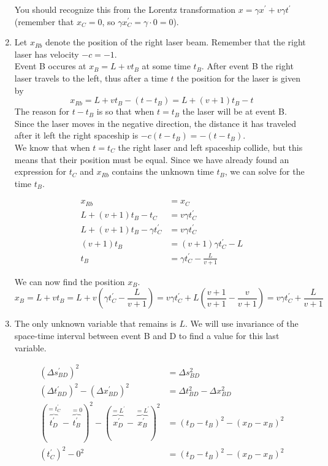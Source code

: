 \documentclass[a4paper,10pt,english]{article}
\begin{document}
\begin{enumerate}
You should recognize this from the Lorentz transformation $x=\gamma x^{\prime}+v\gamma t^{\prime}$ (remember that $x_{C}=0$, so $\gamma x_{C}^{\prime}=\gamma\cdot0=0$).


\item Let $x_{Rb}$ denote the position of the right laser beam. Remember that the right laser has velocity $-c=-1$. 
\\
Event B occures at $x_{B}=L+vt_{B}$ at some time $t_{B}$. After event B the right laser travels to the left, thus after a time $t$ the position for the laser is given by 
\begin{equation}\label{eq:right_laser}x_{Rb}=L+vt_{B}-(t-t_{B})=L+(v+1)t_{B}-t\end{equation}
The reason for $t-t_{B}$ is so that when $t=t_{B}$ the laser will be at event B. Since the laser moves in the negative direction, the distance it has traveled after it left the right spaceship is $-c(t-t_{B})=-(t-t_{B})$.
\\
We know that when $t=t_{C}$ the right laser and left spaceship collide, but this means that their position must be equal. Since we have already found an expression for $t_{C}$ and $x_{Rb}$ contains the unknown time $t_{B}$, we can solve for the time $t_{B}$.

\begin{align*}
x_{Rb}&=x_{C}\\
L+(v+1)t_{B}-t_{C}&=v\gamma t_{C}^{\prime}\\
L+(v+1)t_{B}-\gamma t_{C}^{\prime}&=v\gamma t_{C}^{\prime}\\
(v+1)t_{B}&=(v+1)\gamma t_{C}^{\prime}-L\\
t_{B}&=\gamma t_{C}^{\prime}-\frac{L}{v+1}
\end{align*}

We can now find the position $x_{B}$.
\begin{equation*}
x_{B}=L+vt_{B}=L+v\left(\gamma t_{C}^{\prime}-\frac{L}{v+1}\right)=v\gamma t_{C}^{\prime}+L\left(\frac{v+1}{v+1}-\frac{v}{v+1}\right)=v\gamma t_{C}^{\prime}+\frac{L}{v+1}
\end{equation*}

\item The only unknown variable that remains is $L$. We will use invariance of the space-time interval between event B and D to find a value for this last variable.

\begin{align}\label{eq:unfiniched_interval}
\left(\Delta s_{BD}^{\prime}\right)^{2}&=\Delta s_{BD}^{2} \nonumber\\
\left(\Delta t_{BD}^{\prime}\right)^{2}-\left(\Delta x_{BD}^{\prime}\right)^{2}&=\Delta t_{BD}^{2}-\Delta x_{BD}^{2} \nonumber\\
\left(\overbrace{t_{D}^{\prime}}^{=t_{C}^{\prime}}-\overbrace{t_{B}^{\prime}}^{=0}\right)^{2}-\left(\overbrace{x_{D}^{\prime}}^{=L^{\prime}}-\overbrace{x_{B}^{\prime}}^{=L^{\prime}}\right)^{2}&=\left(t_{D}-t_{B}\right)^{2}-\left(x_{D}-x_{B}\right)^{2} \nonumber\\
\left(t_{C}^{\prime}\right)^{2}-0^{2}&=\left(t_{D}-t_{B}\right)^{2}-\left(x_{D}-x_{B}\right)^{2}
\end{align}


\end{enumerate}
\end{document}
